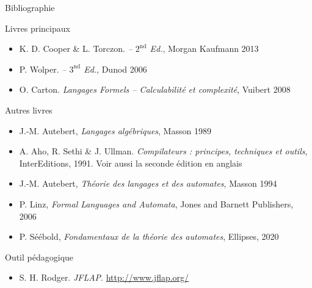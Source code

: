 
\begingroup

\begin{frame}{Bibliographie}
  
  \begin{block}{Livres principaux}\footnotesize
    \begin{itemize}
    \item K. D. Cooper \& L. Torczon. \textit{ -- $2^\text{nd}$ Ed.}, Morgan Kaufmann 2013
    \item P. Wolper. \textit{ -- $3^\text{nd}$ Ed.}, Dunod 2006
    \item O. Carton. \textit{Langages Formels -- Calculabilité et complexité}, Vuibert 2008
    \end{itemize}
  \end{block}

  \begin{block}{Autres livres}\footnotesize
    \begin{itemize}
    \item J.-M. Autebert, \textit{Langages algébriques}, Masson 1989
    \item A. Aho, R. Sethi \& J. Ullman. \textit{Compilateurs : principes, techniques et outils}, InterEditions, 1991. Voir aussi la seconde édition en anglais
    \item J.-M. Autebert, \textit{Théorie des langages et des automates}, Masson 1994
    \item P. Linz, \textit{Formal Languages and Automata}, Jones and Barnett Publishers, 2006
    \item P. Séébold, \textit{Fondamentaux de la théorie des automates}, Ellipses, 2020
    \end{itemize}
  \end{block}

  \begin{block}{Outil pédagogique}\footnotesize
    \begin{itemize}
    \item S. H. Rodger. \textit{JFLAP}. \url{http://www.jflap.org/} 
    \end{itemize}
  \end{block}

\end{frame}

\endgroup
\endinput
